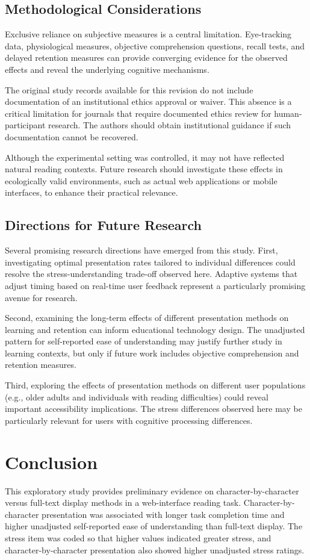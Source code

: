 \documentclass[authoryear]{elsarticle}
\begin{document}
\subsection{Methodological Considerations}
Exclusive reliance on subjective measures is a central limitation. Eye-tracking data, physiological measures, objective comprehension questions, recall tests, and delayed retention measures can provide converging evidence for the observed effects and reveal the underlying cognitive mechanisms.

The original study records available for this revision do not include documentation of an institutional ethics approval or waiver. This absence is a critical limitation for journals that require documented ethics review for human-participant research. The authors should obtain institutional guidance if such documentation cannot be recovered.

Although the experimental setting was controlled, it may not have reflected natural reading contexts. Future research should investigate these effects in ecologically valid environments, such as actual web applications or mobile interfaces, to enhance their practical relevance.

\subsection{Directions for Future Research}
Several promising research directions have emerged from this study. First, investigating optimal presentation rates tailored to individual differences could resolve the stress-understanding trade-off observed here. Adaptive systems that adjust timing based on real-time user feedback represent a particularly promising avenue for research.

Second, examining the long-term effects of different presentation methods on learning and retention can inform educational technology design. The unadjusted pattern for self-reported ease of understanding may justify further study in learning contexts, but only if future work includes objective comprehension and retention measures.

Third, exploring the effects of presentation methods on different user populations (e.g., older adults and individuals with reading difficulties) could reveal important accessibility implications. The stress differences observed here may be particularly relevant for users with cognitive processing differences.

\section{Conclusion}
This exploratory study provides preliminary evidence on character-by-character versus full-text display methods in a web-interface reading task. Character-by-character presentation was associated with longer task completion time and higher unadjusted self-reported ease of understanding than full-text display. The stress item was coded so that higher values indicated greater stress, and character-by-character presentation also showed higher unadjusted stress ratings.
\end{document}
